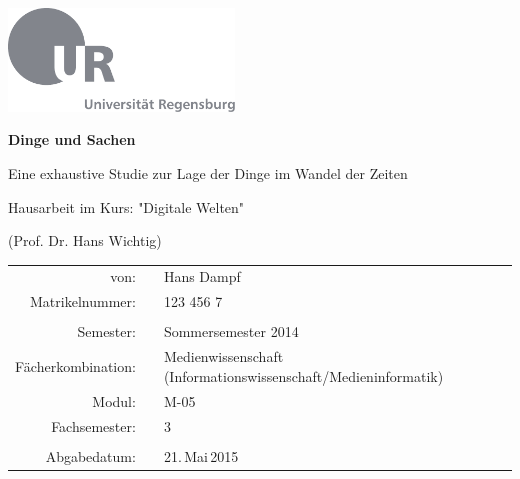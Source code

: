 \documentclass[12pt,ngerman,a4paper,DIV=11]{scrartcl}
\begin{document}
\begin{titlepage}
  \begin{center}

  \hbox{\hspace{2.74cm}\includegraphics[width=0.45\textwidth]{Template/UR-Logo/ur-logo-mit-text.pdf}}

  \vspace{1.8cm}

  {\huge\textbf{Dinge und Sachen}}

    \vspace{0.8cm}
  {\large{Eine exhaustive Studie zur Lage der Dinge im Wandel der Zeiten}}
  
  \vspace{1.5cm}

    Hausarbeit im Kurs: "Digitale Welten"
  
    (Prof. Dr. Hans Wichtig)
  
  \vspace{0.8cm}

  \begin{center}
  \begin{tabular}{ r c l }
  von:               &  & Hans Dampf                                     \\
  Matrikelnummer:    &  & 123 456 7                                \\
                     &  &                                              \\
  Semester:          &  & Sommersemester 2014                                \\
  Fächerkombination: &  & \parbox[t]{6cm}{Medienwissenschaft (Informationswissenschaft/Medieninformatik)}                \\
  Modul:             &  & M-05                                   \\
  Fachsemester:      &  & 3                            \\
                     &  &                                              \\
  Abgabedatum:       &  & 21.\,Mai\,2015
  \end{tabular}
  \end{center}
  \end{center}
\end{titlepage}
\end{document}
